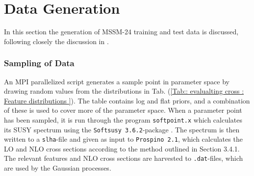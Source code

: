 \documentclass[twoside,english]{uiofysmaster}
\begin{document}
\section{Data Generation}

In this section the generation of MSSM-24 training and test data is discussed, following closely the discussion in \cite{sparre2018fast}. 

\subsubsection{Sampling of Data}

An MPI parallelized script generates a sample point in parameter space by drawing random values from the distributions in Tab. (\ref{Tab:: evalualting cross : Feature distributions }). The table contains log and flat priors, and a combination of these is used to cover more of the parameter space. When a parameter point has been sampled, it is run through the program \verb|softpoint.x| which calculates its SUSY spectrum using the \verb|Softsusy 3.6.2|-package \cite{ALLANACH2002305}. The spectrum is then written to a \verb|slha|-file and given as input to \verb|Prospino 2.1|, which calculates the LO and NLO cross sections according to the method outlined in Section 3.4.1. The relevant features and NLO cross sections are harvested to \verb|.dat|-files, which are used by the Gaussian processes. 
\end{document}
